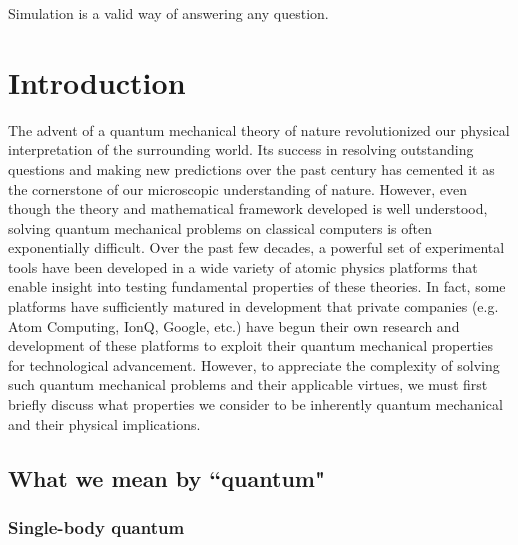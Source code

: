 \begin{savequote}[75mm]
Simulation is a valid way of answering any question.
\end{savequote}



\chapter{Introduction}
\label{introduction}

The advent of a quantum mechanical theory of nature revolutionized our physical interpretation of the surrounding world. Its success in resolving outstanding questions and making new predictions over the past century has cemented it as the cornerstone of our microscopic understanding of nature. However, even though the theory and mathematical framework developed is well understood, solving quantum mechanical problems on classical computers is often exponentially difficult\cite{Feynman1982}. Over the past few decades, a powerful set of experimental tools have been developed in a wide variety of atomic physics platforms that enable insight into testing fundamental properties of these theories. In fact, some platforms have sufficiently matured in development that private companies (e.g. Atom Computing\textsuperscript{\textregistered}, IonQ\textsuperscript{\textregistered}, Google\textsuperscript{\textregistered}, etc.) have begun their own research and development of these platforms to exploit their quantum mechanical properties for technological advancement. However, to appreciate the complexity of solving such quantum mechanical problems and their applicable virtues, we must first briefly discuss what properties we consider to be inherently quantum mechanical and their physical implications. 

\section{What we mean by ``quantum"}

\subsection{Single-body quantum}

